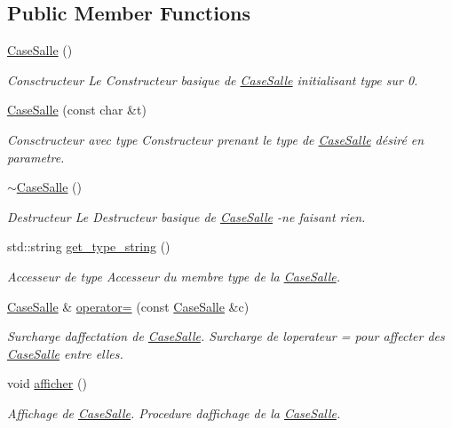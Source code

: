 \subsection*{Public Member Functions}
\begin{DoxyCompactItemize}
\item 
\hyperlink{classCaseSalle_a4252822534722fccb7d8355f79d7f244}{Case\+Salle} ()
\begin{DoxyCompactList}\small\item\em Consctructeur Le Constructeur basique de \hyperlink{classCaseSalle}{Case\+Salle} initialisant type sur 0. \end{DoxyCompactList}\item 
\hyperlink{classCaseSalle_a41a8f19ea923b523eb7695d87cd36342}{Case\+Salle} (const char \&t)
\begin{DoxyCompactList}\small\item\em Consctructeur avec type Constructeur prenant le type de \hyperlink{classCaseSalle}{Case\+Salle} désiré en parametre. \end{DoxyCompactList}\item 
\hyperlink{classCaseSalle_aca43a910dbbb59bdac7af10faa5b3f39}{$\sim$\+Case\+Salle} ()
\begin{DoxyCompactList}\small\item\em Destructeur Le Destructeur basique de \hyperlink{classCaseSalle}{Case\+Salle} -\/ne faisant rien. \end{DoxyCompactList}\item 
std\+::string \hyperlink{classCaseSalle_a13007bde12e9dcf3e1985473700c8fae}{get\+\_\+type\+\_\+string} ()
\begin{DoxyCompactList}\small\item\em Accesseur de {\itshape type} Accesseur du membre {\itshape type} de la \hyperlink{classCaseSalle}{Case\+Salle}. \end{DoxyCompactList}\item 
\hyperlink{classCaseSalle}{Case\+Salle} \& \hyperlink{classCaseSalle_a8494bda87f21c608d7da7bb510c0e525}{operator=} (const \hyperlink{classCaseSalle}{Case\+Salle} \&c)
\begin{DoxyCompactList}\small\item\em Surcharge d\textquotesingle{}affectation de \hyperlink{classCaseSalle}{Case\+Salle}. Surcharge de l\textquotesingle{}operateur = pour affecter des \hyperlink{classCaseSalle}{Case\+Salle} entre elles. \end{DoxyCompactList}\item 
void \hyperlink{classCaseSalle_aa892c144815ba118fa911e91b1658ba3}{afficher} ()
\begin{DoxyCompactList}\small\item\em Affichage de \hyperlink{classCaseSalle}{Case\+Salle}. Procedure d\textquotesingle{}affichage de la \hyperlink{classCaseSalle}{Case\+Salle}. \end{DoxyCompactList}\end{DoxyCompactItemize}


